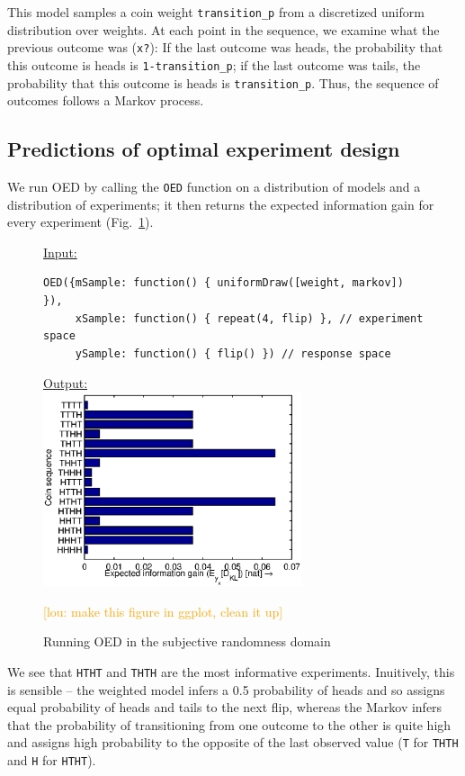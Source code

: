 \documentclass{article}
\newcommand{\lou}[1]{\textcolor{orange}{[lou: #1]}}
\begin{document}
This model samples a coin weight \lstinline{transition_p} from a discretized uniform distribution over weights.
At each point in the sequence, we examine what the previous outcome was (\lstinline{x?}): If the last outcome was heads, the probability that this outcome is heads is \lstinline{1-transition_p}; if the last outcome was tails, the probability that this outcome is heads is \lstinline{transition_p}. Thus, the sequence of outcomes follows a Markov process.

\subsection{Predictions of optimal experiment design}

We run OED by calling the \lstinline{OED} function on a distribution of models and a distribution of experiments; it then returns the expected information gain for every experiment (Fig.~\ref{fig:run-coin}).

\begin{figure}[h!]
\underline{\textsf{Input:}}
\begin{lstlisting}
OED({mSample: function() { uniformDraw([weight, markov]) }),
     xSample: function() { repeat(4, flip) }, // experiment space
     ySample: function() { flip() }) // response space
\end{lstlisting}

\underline{\textsf{Output:}}\\
\includegraphics[width=3in]{img/coin.eps}
\caption{Running OED in the subjective randomness domain}
\lou{make this figure in ggplot, clean it up}
\label{fig:run-coin}
\end{figure}

We see that \lstinline{HTHT} and \lstinline{THTH} are the most informative experiments.
Inuitively, this is sensible -- the weighted model infers a 0.5 probability of heads and so assigns equal probability of heads and tails to the next flip, whereas the Markov infers that the probability of transitioning from one outcome to the other is quite high and assigns high probability to the opposite of the last observed value (\lstinline{T} for \lstinline{THTH} and \lstinline{H} for \lstinline{HTHT}).
\end{document}

